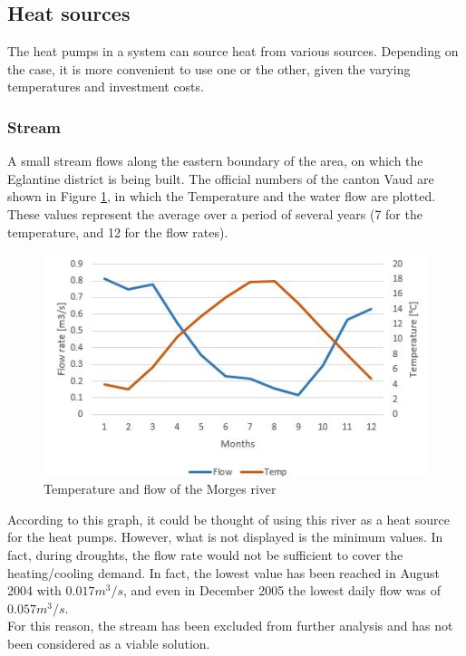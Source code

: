 \documentclass{article}
\begin{document}
\subsection{Heat sources}
The heat pumps in a system can source heat from various sources. Depending on the case, it is more convenient to use one or the other, given the varying temperatures and investment costs.

\subsubsection{Stream}
A small stream flows along the eastern boundary of the area, on which the Eglantine district is being built. The official numbers of the canton Vaud \cite{veillehydro-meteorologiqueducantondevaudMorgesRiviereDebit} are shown in Figure \ref{fig:river}, in which the Temperature and the water flow are plotted. These values represent the average over a period of several years (7 for the temperature, and 12 for the flow rates). 

\begin{figure}[h!]
\centering
\includegraphics[width=1\textwidth]{river.JPG}
\caption{Temperature and flow of the Morges river}
\label{fig:river}
\end{figure}

According to this graph, it could be thought of using this river as a heat source for the heat pumps. However, what is not displayed is the minimum values. In fact, during droughts, the flow rate would not be sufficient to cover the heating/cooling demand. In fact, the lowest value has been reached in August 2004 with $0.017 m^3/s$, and even in December 2005 the lowest daily flow was of $0.057 m^3/s$. \\
For this reason, the stream has been excluded from further analysis and has not been considered as a viable solution.
\end{document}
